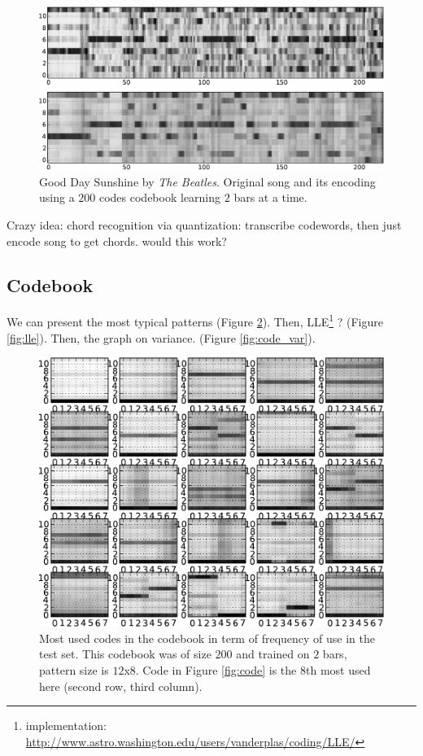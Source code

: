 \documentclass{article}
\begin{document}
\begin{figure}[htb]
\begin{center}
\includegraphics[width=.9\columnwidth]{song_encoded}
\end{center}
\caption{\small{Good Day Sunshine by \textit{The Beatles}.
Original song and its encoding using a $200$ codes codebook learning
$2$ bars at a time.
}}
\label{fig:encodesong}
\end{figure}

Crazy idea: chord recognition via quantization: transcribe codewords,
then just encode song to get chords. would this work?

\subsection{Codebook}
We can present the most typical patterns (Figure \ref{fig:codes1}). 
Then, LLE\footnote{implementation: 
\url{http://www.astro.washington.edu/users/vanderplas/coding/LLE/}} 
\cite{Roweis2000}? (Figure \ref{fig:lle}). 
Then, the graph on variance. (Figure \ref{fig:code_var}).

\begin{figure}[htb]
\begin{center}
\includegraphics[width=.9\columnwidth]{codes1}
\end{center}
\caption{\small{
Most used codes in the codebook in term of frequency of use in the test
set. This codebook was of size $200$ and trained on $2$ bars, pattern
size is $12$x$8$. Code in Figure \ref{fig:code} is the $8$th most used
here (second row, third column).
}}
\label{fig:codes1}
\end{figure}
\end{document}
